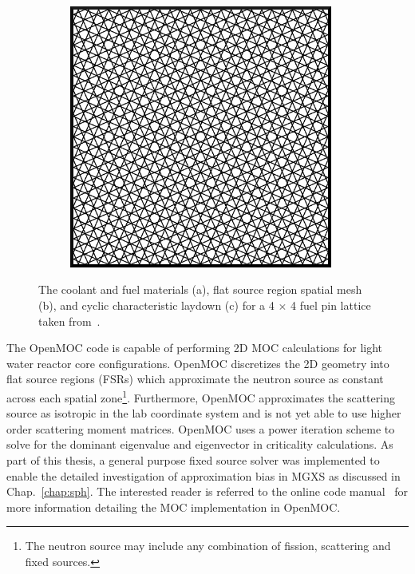 \begin{figure}[h!]
\begin{subfigure}[htb!]{0.32\textwidth}
    \label{fig:moc-model-fsrs}
    \caption{}
  \end{subfigure}
  \begin{subfigure}[htb!]{0.32\textwidth}
    \centering
    \includegraphics[width=0.95\textwidth]{figures/workflow/openmoc/cyclic-tracks}
    \label{fig:moc-model-tracks}
    \caption{}
  \end{subfigure}
\caption[Example OpenMOC flat source region mesh and track laydown]{The coolant and fuel materials (a), flat source region spatial mesh (b), and cyclic characteristic laydown (c) for a 4 $\times$ 4 fuel pin lattice taken from~\cite{boyd2016parallel}.}
\label{fig:moc-model}
\end{figure}

The OpenMOC code is capable of performing 2D \ac{MOC} calculations for light water reactor core configurations. OpenMOC discretizes the 2D geometry into flat source regions (FSRs) which approximate the neutron source as constant across each spatial zone\footnote{The neutron source may include any combination of fission, scattering and fixed sources.}. Furthermore, OpenMOC approximates the scattering source as isotropic in the lab coordinate system and is not yet able to use higher order scattering moment matrices. OpenMOC uses a power iteration scheme to solve for the dominant eigenvalue and eigenvector in criticality calculations. As part of this thesis, a general purpose fixed source solver was implemented to enable the detailed investigation of approximation bias in \ac{MGXS} as discussed in Chap.~\ref{chap:sph}. The interested reader is referred to the online code manual~\cite{openmoc2016manual} for more information detailing the \ac{MOC} implementation in OpenMOC.

